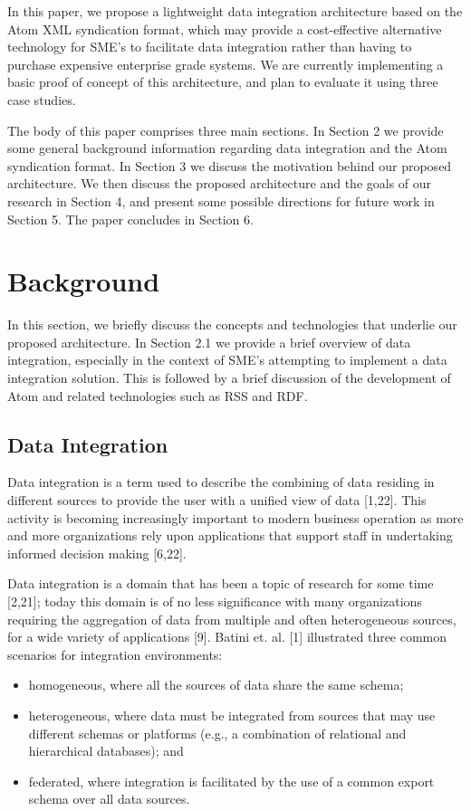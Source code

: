 \documentclass{CRPITStyle}
\begin{document}
In this paper, we propose a lightweight data integration architecture
based on the Atom XML syndication format, which may provide a
cost-effective alternative technology for SME's to facilitate data
integration rather than having to purchase expensive enterprise grade
systems. We are currently implementing a basic proof of concept of this
architecture, and plan to evaluate it using three case studies.

The body of this paper comprises three main sections. In Section 2 we
provide some general background information regarding data integration
and the Atom syndication format. In Section 3 we discuss the motivation
behind our proposed architecture. We then discuss the proposed
architecture and the goals of our research in Section 4, and present
some possible directions for future work in Section 5. The paper
concludes in Section 6.

\section{Background}

In this section, we briefly discuss the concepts and technologies that
underlie our proposed architecture. In Section 2.1 we provide a brief
overview of data integration, especially in the context of SME's
attempting to implement a data integration solution. This is followed by
a brief discussion of the development of Atom and related technologies
such as RSS and RDF.

\subsection{Data Integration}

Data integration is a term used to describe the combining of data
residing in different sources to provide the user with a unified view of
data [1,22]. This activity is becoming increasingly important to modern
business operation as more and more organizations rely upon applications
that support staff in undertaking informed decision making [6,22].

Data integration is a domain that has been a topic of research for some
time [2,21]; today this domain is of no less significance with many
organizations requiring the aggregation of data from multiple and often
heterogeneous sources, for a wide variety of applications [9]. Batini
et. al. [1] illustrated three common scenarios for integration
environments:

\begin{itemize}

	\item homogeneous, where all the sources of data share the same
	schema;

	\item heterogeneous, where data must be integrated from sources that
	may use different schemas or platforms (e.g., a combination of
	relational and hierarchical databases); and

	\item federated, where integration is facilitated by the use of a
	common export schema over all data sources.

\end{itemize}
\end{document}
